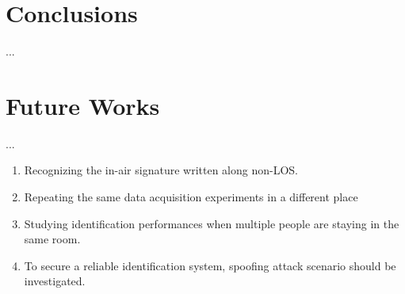 \label{chp:Conclusions}
\section{Conclusions}
...

\section{Future Works}
...
\begin{enumerate}
	\setlength{\itemsep}{1pt}
	\item Recognizing the in-air signature written along non-LOS. 
	\item Repeating the same data acquisition experiments in a different place
	\item Studying identification performances when multiple people are staying in the same room.
	\item To secure a reliable identification system, spoofing attack scenario should be investigated. 
\end{enumerate} 